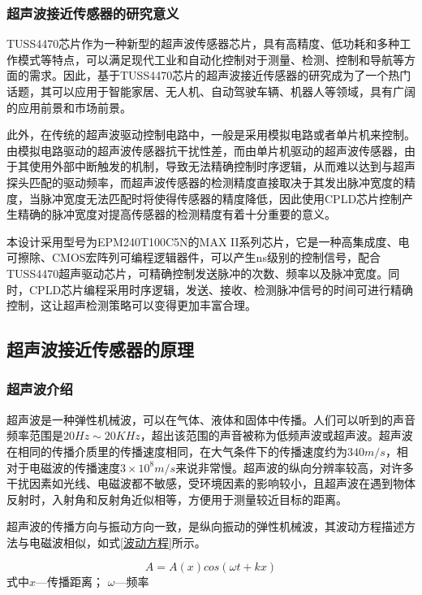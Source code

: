     \subsubsection{超声波接近传感器的研究意义}
    TUSS4470芯片作为一种新型的超声波传感器芯片，具有高精度、低功耗和多种工作模式等特点，可以满足现代工业和自动化控制对于测量、检测、控制和导航等方面的需求。因此，基于TUSS4470芯片的超声波接近传感器的研究成为了一个热门话题，其可以应用于智能家居、无人机、自动驾驶车辆、机器人等领域，具有广阔的应用前景和市场前景。\par
    此外，在传统的超声波驱动控制电路中，一般是采用模拟电路或者单片机来控制。由模拟电路驱动的超声波传感器抗干扰性差，而由单片机驱动的超声波传感器，由于其使用外部中断触发的机制，导致无法精确控制时序逻辑，从而难以达到与超声探头匹配的驱动频率，而超声波传感器的检测精度直接取决于其发出脉冲宽度的精度，当脉冲宽度无法匹配时将使得传感器的精度降低，因此使用CPLD芯片控制产生精确的脉冲宽度对提高传感器的检测精度有着十分重要的意义。\par
    本设计采用型号为EPM240T100C5N的MAX II系列芯片，它是一种高集成度、电可擦除、CMOS宏阵列可编程逻辑器件，可以产生ns级别的控制信号，配合TUSS4470超声驱动芯片，可精确控制发送脉冲的次数、频率以及脉冲宽度。同时，CPLD芯片编程采用时序逻辑，发送、接收、检测脉冲信号的时间可进行精确控制，这让超声检测策略可以变得更加丰富合理。
    \subsection{超声波接近传感器的原理}
    \subsubsection{超声波介绍}
      超声波是一种弹性机械波，可以在气体、液体和固体中传播。人们可以听到的声音频率范围是$20Hz\sim20KHz$，超出该范围的声音被称为低频声波或超声波。超声波在相同的传播介质里的传播速度相同，在大气条件下的传播速度约为$340m/s$，相对于电磁波的传播速度$3\times10^8m/s$来说非常慢。超声波的纵向分辨率较高，对许多干扰因素如光线、电磁波都不敏感，受环境因素的影响较小，且超声波在遇到物体反射时，入射角和反射角近似相等，方便用于测量较近目标的距离。
      
      超声波的传播方向与振动方向一致，是纵向振动的弹性机械波，其波动方程描述方法与电磁波相似，如式\ref{波动方程}所示。

    \begin{equation}
    	A=A(x)cos(\omega t+kx)
    	\label{波动方程}
    \end{equation}
	式中\quad$x$---传播距离；
	\quad$\omega$---频率


